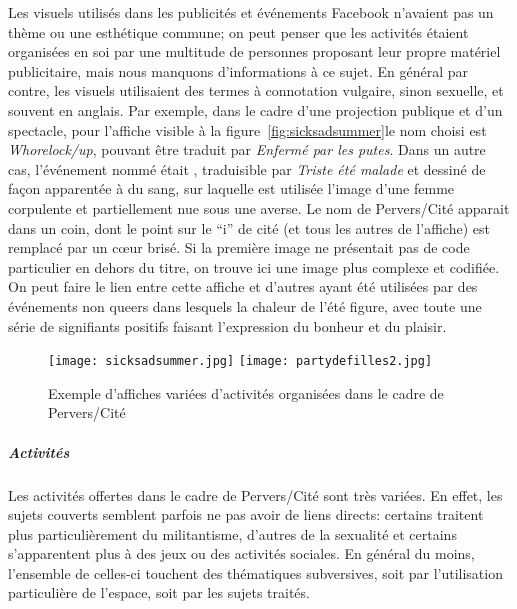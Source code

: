 Les visuels utilisés dans les publicités et événements Facebook n'avaient pas un thème ou une esthétique commune; on peut penser que les activités étaient organisées en soi par une multitude de personnes proposant leur propre matériel publicitaire, mais nous manquons d'informations à ce sujet.
En général par contre, les visuels utilisaient des termes à connotation vulgaire, sinon sexuelle, et souvent en anglais.
Par exemple, dans le cadre d'une projection publique et d'un spectacle, pour l'affiche visible à la figure~\ref{fig:sicksadsummer}le nom choisi est \emph{Whorelock/up}, pouvant être traduit par \emph{Enfermé par les putes}.
Dans un autre cas, l'événement nommé était , traduisible par \emph{Triste été malade} et dessiné de façon apparentée à du sang, sur laquelle est utilisée l'image d'une femme corpulente et partiellement nue sous une averse.
Le nom de Pervers/Cité apparait dans un coin, dont le point sur le \enquote{i} de cité (et tous les autres de l'affiche) est remplacé par un cœur brisé.
Si la première image ne présentait pas de code particulier en dehors du titre, on trouve ici une image plus complexe et codifiée.
On peut faire le lien entre cette affiche et d'autres ayant été utilisées par des événements non queers dans lesquels la chaleur de l'été figure, avec toute une série de signifiants positifs faisant l'expression du bonheur et du plaisir.

\begin{figure}
\centering
{}
{\texttt{[image: sicksadsummer.jpg]}}
{\texttt{[image: partydefilles2.jpg]}}
\caption[Exemples d'affiches de Pervers/Cité]{Exemple d'affiches variées d'activités organisées dans le cadre de Pervers/Cité}\label{figs:partydefilles}
\end{figure}

\subparagraph{Activités}
\label{subsec:activitesperverscite}
Les activités offertes dans le cadre de Pervers/Cité sont très variées.
En effet, les sujets couverts semblent parfois ne pas avoir de liens directs: certains traitent plus particulièrement du militantisme, d'autres de la sexualité et certains s'apparentent plus à des jeux ou des activités sociales.
En général du moins, l'ensemble de celles-ci touchent des thématiques subversives, soit par l'utilisation particulière de l'espace, soit par les sujets traités.

